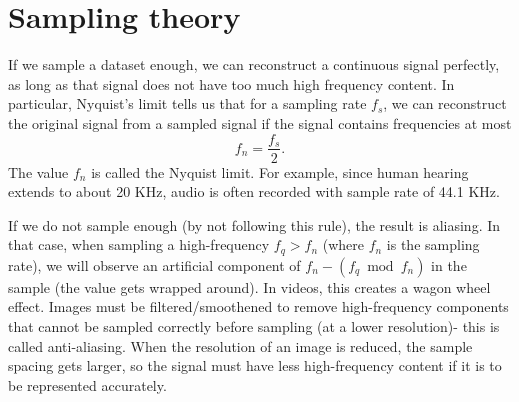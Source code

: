 \documentclass[a4paper, openany]{memoir}
\begin{document}
\section{Sampling theory}
If we sample a dataset enough, we can reconstruct a continuous signal perfectly, as long as that signal does not have too much high frequency content. In particular, Nyquist's limit tells us that for a sampling rate $f_s$, we can reconstruct the original signal from a sampled signal if the signal contains frequencies at most
\[f_n = \frac{f_s}{2}.\]
The value $f_n$ is called the Nyquist limit. For example, since human hearing extends to about 20 KHz, audio is often recorded with sample rate of 44.1 KHz.

If we do not sample enough (by not following this rule), the result is aliasing. In that case, when sampling a high-frequency $f_q > f_n$ (where $f_n$ is the sampling rate), we will observe an artificial component of $f_n - (f_q \bmod{f_n})$ in the sample (the value gets wrapped around). In videos, this creates a wagon wheel effect. Images must be filtered/smoothened to remove high-frequency components that cannot be sampled correctly before sampling (at a lower resolution)- this is called anti-aliasing. When the resolution of an image is reduced, the sample spacing gets larger, so the signal must have less high-frequency content if it is to be represented accurately.
\end{document}
